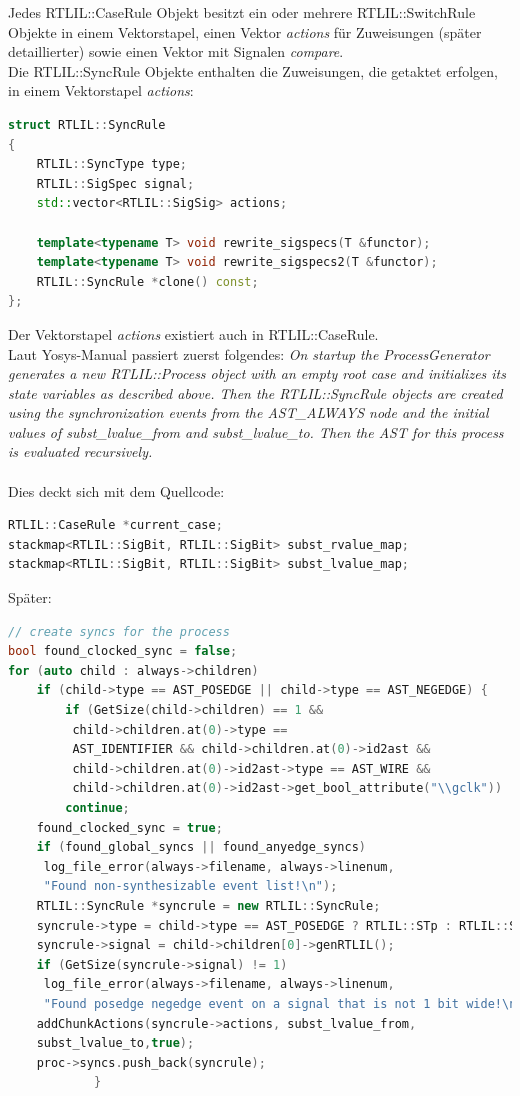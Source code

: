 \documentclass[11pt]{report}
\begin{document}
Jedes RTLIL::CaseRule Objekt besitzt ein oder mehrere RTLIL::SwitchRule Objekte in einem Vektorstapel, einen Vektor \textit{actions} für Zuweisungen (später detaillierter) sowie einen Vektor mit Signalen \textit{compare}.\\
Die RTLIL::SyncRule Objekte enthalten die Zuweisungen, die getaktet erfolgen, in einem Vektorstapel \textit{actions}:
\begin{lstlisting}[language=C++]
struct RTLIL::SyncRule
{
	RTLIL::SyncType type;
	RTLIL::SigSpec signal;
	std::vector<RTLIL::SigSig> actions;

	template<typename T> void rewrite_sigspecs(T &functor);
	template<typename T> void rewrite_sigspecs2(T &functor);
	RTLIL::SyncRule *clone() const;
};
\end{lstlisting}
Der Vektorstapel \textit{actions} existiert auch in RTLIL::CaseRule.\\
Laut Yosys-Manual passiert zuerst folgendes:
\textit{
On startup the ProcessGenerator generates a new RTLIL::Process object with an empty root case and initializes its state variables as described above. Then the RTLIL::SyncRule objects are created using the synchronization events from the AST\_ALWAYS node and the initial values of subst\_lvalue\_from and subst\_lvalue\_to. Then the AST for this process is evaluated recursively.
}
\\
\\
Dies deckt sich mit dem Quellcode:
\begin{lstlisting}[language=C++]
RTLIL::CaseRule *current_case;
stackmap<RTLIL::SigBit, RTLIL::SigBit> subst_rvalue_map;
stackmap<RTLIL::SigBit, RTLIL::SigBit> subst_lvalue_map;
\end{lstlisting}
Später:
\begin{lstlisting}[language=C++]
// create syncs for the process
bool found_clocked_sync = false;
for (auto child : always->children)
	if (child->type == AST_POSEDGE || child->type == AST_NEGEDGE) {
		if (GetSize(child->children) == 1 && 
		 child->children.at(0)->type == 
		 AST_IDENTIFIER && child->children.at(0)->id2ast &&
		 child->children.at(0)->id2ast->type == AST_WIRE && 
		 child->children.at(0)->id2ast->get_bool_attribute("\\gclk"))
		continue;
	found_clocked_sync = true;
	if (found_global_syncs || found_anyedge_syncs)
	 log_file_error(always->filename, always->linenum, 
	 "Found non-synthesizable event list!\n");
	RTLIL::SyncRule *syncrule = new RTLIL::SyncRule;
	syncrule->type = child->type == AST_POSEDGE ? RTLIL::STp : RTLIL::STn;
	syncrule->signal = child->children[0]->genRTLIL();
	if (GetSize(syncrule->signal) != 1)
	 log_file_error(always->filename, always->linenum, 
	 "Found posedge negedge event on a signal that is not 1 bit wide!\n");
	addChunkActions(syncrule->actions, subst_lvalue_from, 
	subst_lvalue_to,true);
	proc->syncs.push_back(syncrule);
			}
\end{lstlisting}
\end{document}

